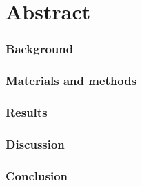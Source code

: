 \chapter{Abstract}

\subsection{Background}

\subsection{Materials and methods}

\subsection{Results}

\subsection{Discussion}

\subsection{Conclusion}
